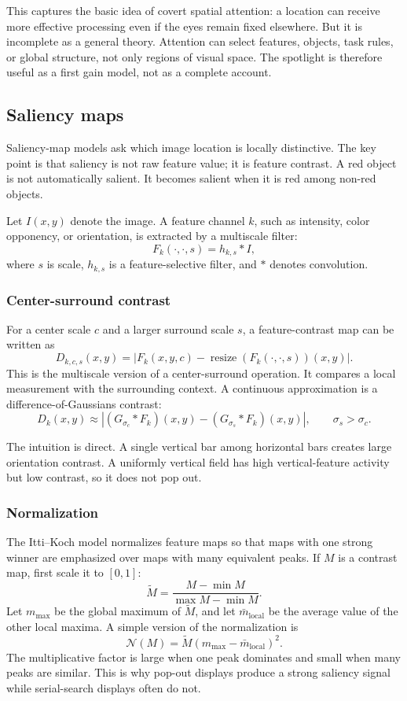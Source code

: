 This captures the basic idea of covert spatial attention: a location can receive more effective processing even if the eyes remain fixed elsewhere. But it is incomplete as a general theory. Attention can select features, objects, task rules, or global structure, not only regions of visual space. The spotlight is therefore useful as a first gain model, not as a complete account.

\subsection{Saliency maps}

Saliency-map models ask which image location is locally distinctive. The key point is that saliency is not raw feature value; it is feature contrast. A red object is not automatically salient. It becomes salient when it is red among non-red objects.

Let \(I(x,y)\) denote the image. A feature channel \(k\), such as intensity, color opponency, or orientation, is extracted by a multiscale filter:
\[
F_k(\cdot,\cdot,s) = h_{k,s} * I,
\]
where \(s\) is scale, \(h_{k,s}\) is a feature-selective filter, and \(*\) denotes convolution.

\subsubsection{Center-surround contrast}

For a center scale \(c\) and a larger surround scale \(s\), a feature-contrast map can be written as
\[
D_{k,c,s}(x,y)
=
\left|
F_k(x,y,c)
-
\operatorname{resize}\!\left(F_k(\cdot,\cdot,s)\right)(x,y)
\right|.
\]
This is the multiscale version of a center-surround operation. It compares a local measurement with the surrounding context. A continuous approximation is a difference-of-Gaussians contrast:
\[
D_k(x,y)
\approx
\left|
(G_{\sigma_c} * F_k)(x,y)
-
(G_{\sigma_s} * F_k)(x,y)
\right|,
\qquad
\sigma_s > \sigma_c .
\]

The intuition is direct. A single vertical bar among horizontal bars creates large orientation contrast. A uniformly vertical field has high vertical-feature activity but low contrast, so it does not pop out.

\subsubsection{Normalization}

The Itti--Koch model normalizes feature maps so that maps with one strong winner are emphasized over maps with many equivalent peaks. If \(M\) is a contrast map, first scale it to \([0,1]\):
\[
\widetilde M = \frac{M-\min M}{\max M-\min M}.
\]
Let \(m_{\max}\) be the global maximum of \(\widetilde M\), and let \(\bar m_{\mathrm{local}}\) be the average value of the other local maxima. A simple version of the normalization is
\[
\mathcal N(M)
=
\widetilde M
\left(m_{\max}-\bar m_{\mathrm{local}}\right)^2.
\]
The multiplicative factor is large when one peak dominates and small when many peaks are similar. This is why pop-out displays produce a strong saliency signal while serial-search displays often do not.

